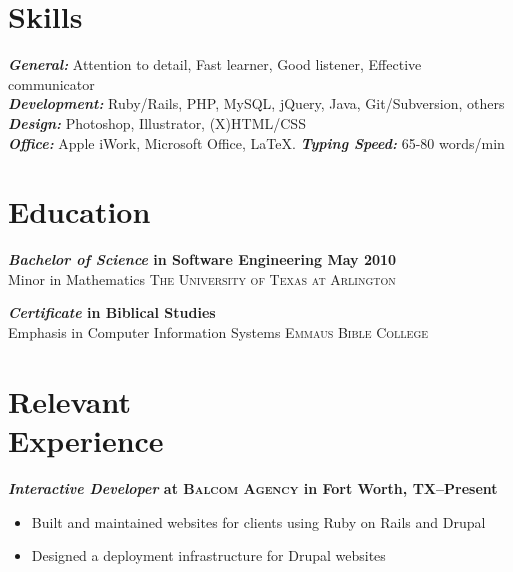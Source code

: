 \documentclass[margin]{res}
\newcommand{\sectionspace}{\vspace{8pt}}
\begin{document}
\begin{resume}

\section{\textsf{Skills}}

                \textbf{\textit{General:}} Attention to detail, Fast learner, Good listener, Effective communicator  \\
                \textbf{\textit{Development:}} Ruby/Rails, PHP, MySQL, jQuery, Java, Git/Subversion, others                \\
                \textbf{\textit{Design:}} Photoshop, Illustrator, (X)HTML/CSS                                       \\
                \textbf{\textit{Office:}} Apple iWork, Microsoft Office, \LaTeX. \textbf{\textit{Typing Speed:}} 65-80 words/min

\sectionspace

\section{\textsf{Education}}

                \textbf{\textit{Bachelor of Science} in Software Engineering \dotfill May 2010 }  \\
                Minor in Mathematics \hfill  \textsc{The University of Texas at Arlington}

                \textbf{\textit{Certificate} in Biblical Studies  } \\
                Emphasis in Computer Information Systems \hfill  \textsc{Emmaus Bible College}

\sectionspace


\section{\textsf{Relevant \\ Experience}}

                \textbf{\textit{Interactive Developer}
         at \textsc{Balcom Agency} in Fort Worth, TX--Present}
         \vspace{-10pt}\begin{itemize} \itemsep -2pt %
           \item Built and maintained websites for clients using Ruby on Rails and Drupal
           \item Designed a deployment infrastructure for Drupal websites
         \end{itemize}


\end{resume}
\end{document}
